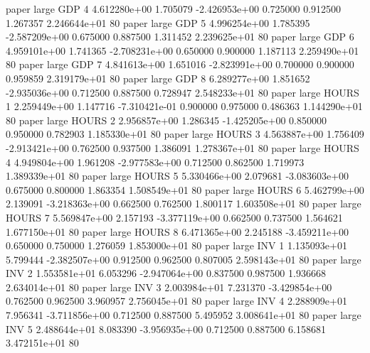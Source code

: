               paper      large      GDP                 4 4.612280e+00      1.705079 -2.426953e+00 0.725000 0.912500       1.267357 2.246644e+01 80
              paper      large      GDP                 5 4.996254e+00      1.785395 -2.587209e+00 0.675000 0.887500       1.311452 2.239625e+01 80
              paper      large      GDP                 6 4.959101e+00      1.741365 -2.708231e+00 0.650000 0.900000       1.187113 2.259490e+01 80
              paper      large      GDP                 7 4.841613e+00      1.651016 -2.823991e+00 0.700000 0.900000       0.959859 2.319179e+01 80
              paper      large      GDP                 8 6.289277e+00      1.851652 -2.935036e+00 0.712500 0.887500       0.728947 2.548233e+01 80
              paper      large    HOURS                 1 2.259449e+00      1.147716 -7.310421e-01 0.900000 0.975000       0.486363 1.144290e+01 80
              paper      large    HOURS                 2 2.956857e+00      1.286345 -1.425205e+00 0.850000 0.950000       0.782903 1.185330e+01 80
              paper      large    HOURS                 3 4.563887e+00      1.756409 -2.913421e+00 0.762500 0.937500       1.386091 1.278367e+01 80
              paper      large    HOURS                 4 4.949804e+00      1.961208 -2.977583e+00 0.712500 0.862500       1.719973 1.389339e+01 80
              paper      large    HOURS                 5 5.330466e+00      2.079681 -3.083603e+00 0.675000 0.800000       1.863354 1.508549e+01 80
              paper      large    HOURS                 6 5.462799e+00      2.139091 -3.218363e+00 0.662500 0.762500       1.800117 1.603508e+01 80
              paper      large    HOURS                 7 5.569847e+00      2.157193 -3.377119e+00 0.662500 0.737500       1.564621 1.677150e+01 80
              paper      large    HOURS                 8 6.471365e+00      2.245188 -3.459211e+00 0.650000 0.750000       1.276059 1.853000e+01 80
              paper      large      INV                 1 1.135093e+01      5.799444 -2.382507e+00 0.912500 0.962500       0.807005 2.598143e+01 80
              paper      large      INV                 2 1.553581e+01      6.053296 -2.947064e+00 0.837500 0.987500       1.936668 2.634014e+01 80
              paper      large      INV                 3 2.003984e+01      7.231370 -3.429854e+00 0.762500 0.962500       3.960957 2.756045e+01 80
              paper      large      INV                 4 2.288909e+01      7.956341 -3.711856e+00 0.712500 0.887500       5.495952 3.008641e+01 80
              paper      large      INV                 5 2.488644e+01      8.083390 -3.956935e+00 0.712500 0.887500       6.158681 3.472151e+01 80
